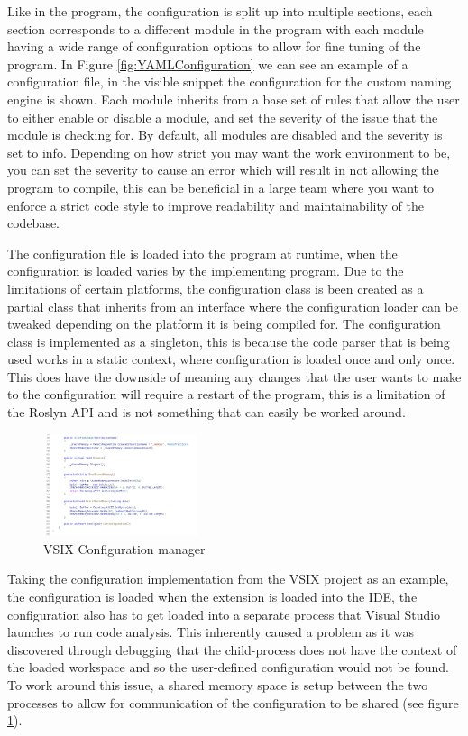 Like in the program, the configuration is split up into multiple sections, each section corresponds to a different module in the program with each module having a wide range of configuration options to allow for fine tuning of the program. In Figure \ref{fig:YAMLConfiguration} we can see an example of a configuration file, in the visible snippet the configuration for the custom naming engine is shown. Each module inherits from a base set of rules that allow the user to either enable or disable a module, and set the severity of the issue that the module is checking for. By default, all modules are disabled and the severity is set to info. Depending on how strict you may want the work environment to be, you can set the severity to cause an error which will result in not allowing the program to compile, this can be beneficial in a large team where you want to enforce a strict code style to improve readability and maintainability of the codebase.

The configuration file is loaded into the program at runtime, when the configuration is loaded varies by the implementing program. Due to the limitations of certain platforms, the configuration class is been created as a partial class that inherits from an interface where the configuration loader can be tweaked depending on the platform it is being compiled for. The configuration class is implemented as a singleton, this is because the code parser that is being used works in a static context, where configuration is loaded once and only once. This does have the downside of meaning any changes that the user wants to make to the configuration will require a restart of the program, this is a limitation of the Roslyn API and is not something that can easily be worked around.

\begin{figure}
    \centering
    \caption{VSIX Configuration manager}
    \label{fig:VSIXConfigurationManager}
    \includegraphics[width=0.4\textwidth]{Figures/VSIXAConfigManagerCropped.png}
\end{figure}

Taking the configuration implementation from the VSIX project as an example, the configuration is loaded when the extension is loaded into the IDE, the configuration also has to get loaded into a separate process that Visual Studio launches to run code analysis. This inherently caused a problem as it was discovered through debugging that the child-process does not have the context of the loaded workspace and so the user-defined configuration would not be found. To work around this issue, a shared memory space is setup between the two processes to allow for communication of the configuration to be shared (see figure \ref{fig:VSIXConfigurationManager}).
